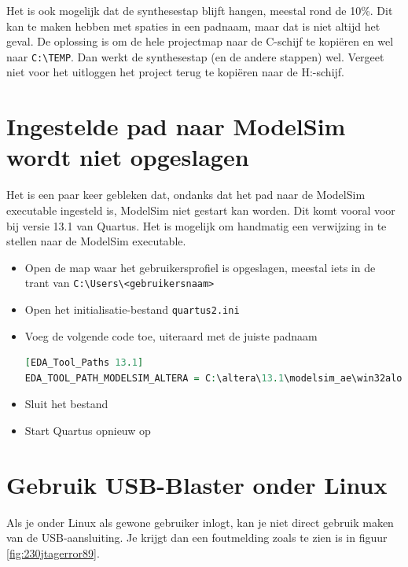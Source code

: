 \documentclass[a4paper,12pt,fleqn,twoside]{book}
\begin{document}
Het is ook mogelijk dat de synthesestap blijft hangen, meestal rond de 10\%.
Dit kan te maken hebben met spaties in een padnaam, maar dat is niet altijd
het geval. De oplossing is om de hele projectmap naar de C-schijf te kopi\"eren
en wel naar \lstinline|C:\TEMP|. Dan werkt de synthesestap (en de andere stappen)
wel. Vergeet niet voor het uitloggen het project terug te kopi\"eren naar de
H:-schijf.

\fi


\section{Ingestelde pad naar ModelSim wordt niet opgeslagen}
\label{sec:ingesteldepadnaarmodelsimwordtnietopgeslagen}
Het is een paar keer gebleken dat, ondanks dat het pad naar de ModelSim
executable ingesteld is, ModelSim niet gestart kan worden. Dit komt vooral
voor bij versie 13.1 van Quartus. Het is mogelijk om handmatig een
verwijzing in te stellen naar de ModelSim executable.

\begin{itemize}\itemsep-1pt
\item Open de map waar het gebruikersprofiel is opgeslagen, meestal iets in
      de trant van \lstinline|C:\Users\<gebruikersnaam>|
\item Open het initialisatie-bestand \lstinline|quartus2.ini|
\item Voeg de volgende code toe, uiteraard met de juiste padnaam
\begin{lstlisting}[language=VHDL,numbers=none,belowskip=-3.5ex]
[EDA_Tool_Paths 13.1]
EDA_TOOL_PATH_MODELSIM_ALTERA = C:\altera\13.1\modelsim_ae\win32aloem
\end{lstlisting}
\item Sluit het bestand
\item Start Quartus opnieuw op

\end{itemize}


\section{Gebruik USB-Blaster onder Linux}
\label{sec:gebruikvanusbblasteronderlinux}
Als je onder Linux als gewone gebruiker inlogt, kan je niet direct gebruik
maken van de USB-aansluiting. Je krijgt dan een foutmelding zoals te zien is
in figuur \ref{fig:230jtagerror89}.

\end{document}
